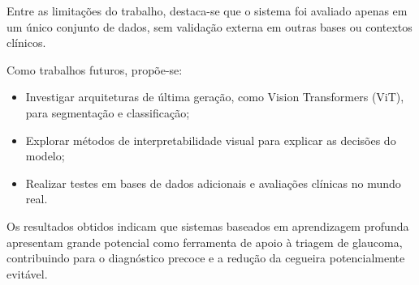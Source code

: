 \documentclass[12pt]{article}
\begin{document}
Entre as limitações do trabalho, destaca-se que o sistema foi avaliado apenas em um único conjunto de dados, sem validação externa em outras bases ou contextos clínicos. %

Como trabalhos futuros, propõe-se:
\begin{itemize}[noitemsep]
    \item Investigar arquiteturas de última geração, como Vision Transformers (ViT), para segmentação e classificação;
    \item Explorar métodos de interpretabilidade visual para explicar as decisões do modelo;
    \item Realizar testes em bases de dados adicionais e avaliações clínicas no mundo real.
\end{itemize}

Os resultados obtidos indicam que sistemas baseados em aprendizagem profunda apresentam grande potencial como ferramenta de apoio à triagem de glaucoma, contribuindo para o diagnóstico precoce e a redução da cegueira potencialmente evitável.







\newpage


% 



\end{document}

